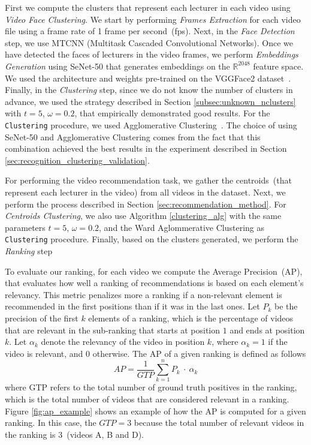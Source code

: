 First we compute the clusters that represent each lecturer in each video using \emph{Video Face Clustering}. 
We start by performing \emph{Frames Extraction} for each video file using a frame rate of 1 frame per second~(fps). 
Next, in the \emph{Face Detection} step, we use MTCNN \cite{mtcnn} (Multitask
Cascaded Convolutional Networks).
Once we have detected the faces of lecturers in the video frames, we perform \emph{Embeddings Generation} using SeNet-50 \cite{senet} that generates embeddings on the $\mathbb{R}^{2048}$ feature space. 
We used the architecture and weights pre-trained on the VGGFace2 dataset~\cite{cao2018vggface2}.
Finally, in the \emph{Clustering} step, since we do not know the number of clusters in advance, we used the strategy described in Section \ref{subsec:unknown_nclusters} with $t=5$, $\omega=0.2$, that empirically demonstrated good results. For the \texttt{Clustering} procedure, we used Agglomerative Clustering~\cite{ward1963hierarchical}.
The choice of using SeNet-50 and Agglomerative Clustering comes from the fact that this combination achieved the best results in the experiment described in Section \ref{sec:recognition_clustering_validation}.

For performing the video recommendation task, we gather the centroids~(that represent each lecturer in the video) from all videos in the dataset. Next, we perform the process described in Section \ref{sec:recommendation_method}. For \emph{Centroids Clustering}, we also use Algorithm \ref{clustering_alg} with the same parameters $t=5$, $\omega=0.2$, and the Ward Aglommerative Clustering as \texttt{Clustering} procedure. Finally, based on the clusters generated, we perform the \emph{Ranking} step

To evaluate our ranking, for each video we compute the Average Precision~(AP), that evaluates how well a ranking of recommendations is based on each element's relevancy. 
This metric penalizes more a ranking if a non-relevant element is recommended in the first positions than if it was in the last ones.
Let $P_k$ be the precision of the first $k$ elements of a ranking, which is the percentage of videos that are relevant in the sub-ranking that starts at position $1$ and ends at position $k$.
Let $\alpha_k$ denote the relevancy of the video in position $k$, where $\alpha_k = 1$ if the video is relevant, and $0$ otherwise.
The AP of a given ranking is defined as follows
\begin{equation}
  \label{equation:average_precision}
  AP = \frac{1}{GTP}\sum_{k=1}^{n}{P_k~\cdot~\alpha_k}
\end{equation}
where GTP refers to the total number of ground truth positives in the ranking, which is the total number of videos that are considered relevant in a ranking. Figure \ref{fig:ap_example} shows an example of how the AP is computed for a given ranking. In this case, the $GTP=3$ because the total number of relevant videos in the ranking is 3~(videos A, B and D).

